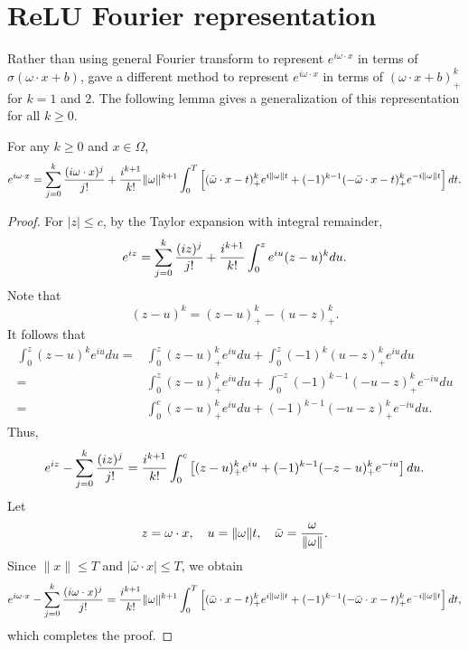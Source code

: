 \section{ReLU Fourier representation}\label{sec:error2}
Rather than using general Fourier transform  to represent
$e^{i\omega\cdot x}$ in terms of $\sigma(\omega\cdot x+b)$, 
\cite{klusowski2016uniform} gave a different method to represent
$e^{i\omega\cdot x}$ in terms of $(\omega\cdot x+b)_+^k$  for $k=1$
and $2$.   The following lemma gives a generalization of this
representation for all $k\ge 0$. 
\begin{lemma}\label{lm:talorcomplex}
For any $k\ge0$ and $x\in \Omega$,
\begin{equation}  
e^{i\omega\cdot x} =\sum_{j=0}^k{(i\omega\cdot x)^{j}\over j!} 
+
{i^{k+1}\over k!} \|\omega\|^{k+1}\int_{0}^T\left[(\bar \omega\cdot x - t)_+^ke^{i\|\omega\|t}
+(-1)^{k-1}(-\bar \omega\cdot x - t)_+^ke^{-i\|\omega\|t} \right]dt.
\end{equation} 
\end{lemma}
\begin{proof}  
For $|z|\leq c$, by the Taylor expansion with integral remainder,
\begin{equation} 
e^{iz} = \sum_{j=0}^k {(iz)^j\over j!} + {i^{k+1}\over k!} \int_0^z e^{iu}(z-u)^kdu.
\end{equation}
Note that 
$$
(z-u)^k=(z-u)^k_+ - (u-z)^k_+.
$$
It follows that
\begin{equation}
\begin{split}
\int_{0}^z (z-u)^ke^{iu} du=&\int_{0}^z (z-u)_+^ke^{iu} du + \int_{0}^z (-1)^k(u-z)_+^ke^{iu} du
\\
=&\int_{0}^z (z-u)_+^ke^{iu} du + \int_{0}^{-z} (-1)^{k-1}(-u-z)_+^ke^{-iu} du
\\
=&\int_{0}^c (z-u)_+^ke^{iu} du + (-1)^{k-1}(-u-z)_+^ke^{-iu} du.
\end{split}
\end{equation}
Thus,
\begin{equation}  
e^{iz} - \sum_{j=0}^k{(iz)^{j}\over j!} 
= 
{i^{k+1}\over k!}\int_{0}^c\left[(z - u)_+^ke^{iu} + (-1)^{k-1}(-z - u)_+^ke^{-iu} \right]du.
\end{equation}  
Let 
\begin{equation}\label{baromega}
z=\omega\cdot x,\quad u=\|\omega\|t,\quad \bar \omega={\omega\over \|\omega\|}.
\end{equation}
Since $\|x\| \le T$ and $|\bar \omega \cdot x|\le T$, we obtain
\begin{equation}  
e^{i\omega\cdot x} - \sum_{j=0}^k{(i\omega\cdot x)^{j}\over j!} 
= 
{i^{k+1}\over k!} \|\omega\|^{k+1}\int_{0}^T\left[(\bar \omega\cdot x - t)_+^ke^{i\|\omega\|t}
+(-1)^{k-1}(-\bar \omega\cdot x - t)_+^ke^{-i\|\omega\|t} \right]dt,
\end{equation} 
which completes the proof.
\end{proof}

